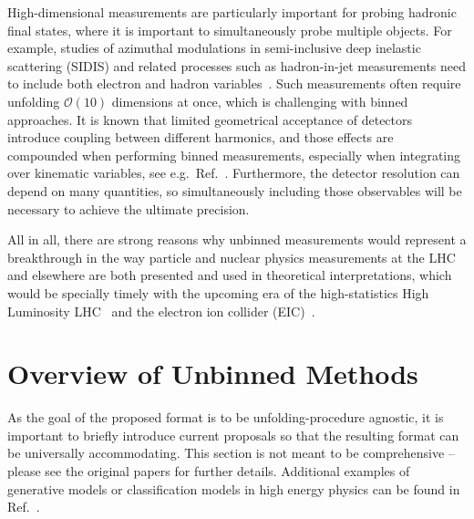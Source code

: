 \documentclass[a4paper,11pt]{article}
\begin{document}
High-dimensional measurements are particularly important for probing hadronic final states, where it is important to simultaneously probe multiple objects.  For example, studies of azimuthal modulations in semi-inclusive deep inelastic scattering (SIDIS) and related processes such as hadron-in-jet measurements need to include both electron and hadron variables~\cite{Arratia:2020nxw}.  Such measurements often require unfolding $\mathcal{O}(10)$ dimensions at once, which is challenging with binned approaches.  It is known that limited geometrical acceptance of detectors introduce coupling between different harmonics, and those effects are compounded when performing binned measurements, especially when integrating over kinematic variables, see e.g.\ Ref.~\cite{Hayward:2021psm}.   Furthermore, the detector resolution can depend on many quantities, so simultaneously including those observables will be necessary to achieve the ultimate precision.  


All in all, there are strong reasons
why unbinned measurements would represent
a breakthrough in the way particle and nuclear physics measurements at the LHC and elsewhere
are both presented and used in theoretical
interpretations, which would be specially timely
with the upcoming era of the high-statistics
High Luminosity LHC~\cite{Azzi:2019yne,Cepeda:2019klc} and the electron ion collider (EIC)~\cite{AbdulKhalek:2021gbh}.


\section{Overview of Unbinned Methods}
\label{sec:unbinnedmethods}

As the goal of the proposed format is to be unfolding-procedure agnostic, it is important to briefly introduce current proposals so that the resulting format can be universally accommodating.  This section is not meant to be comprehensive -- please see the original papers for further details.   Additional examples of generative models or classification models in high energy physics can be found in Ref.~\cite{2102.02770}.
\end{document}
